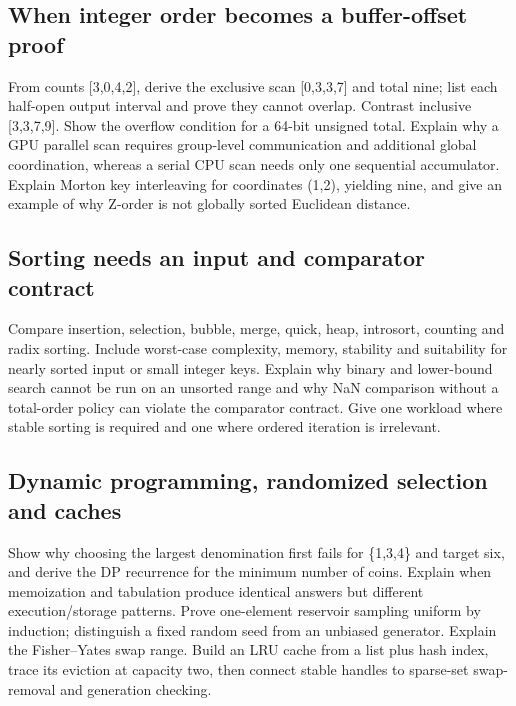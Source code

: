 \subsection{When integer order becomes a buffer-offset proof}\label{appendix-8a046b38375e-when-integer-order-becomes-a-buffer-offset-proof}

\hypertarget{appendix-8a046b38375e-when-integer-order-becomes-a-buffer-offset-proof}{}

From counts {[}3,0,4,2{]}, derive the exclusive scan {[}0,3,3,7{]} and total nine; list each half-open output interval and prove they cannot overlap. Contrast inclusive {[}3,3,7,9{]}. Show the overflow condition for a 64-bit unsigned total. Explain why a GPU parallel scan requires group-level communication and additional global coordination, whereas a serial CPU scan needs only one sequential accumulator. Explain Morton key interleaving for coordinates (1,2), yielding nine, and give an example of why Z-order is not globally sorted Euclidean distance.

\subsection{Sorting needs an input and comparator contract}\label{appendix-8a046b38375e-sorting-needs-an-input-and-comparator-contract}

\hypertarget{appendix-8a046b38375e-sorting-needs-an-input-and-comparator-contract}{}

Compare insertion, selection, bubble, merge, quick, heap, introsort, counting and radix sorting. Include worst-case complexity, memory, stability and suitability for nearly sorted input or small integer keys. Explain why binary and lower-bound search cannot be run on an unsorted range and why NaN comparison without a total-order policy can violate the comparator contract. Give one workload where stable sorting is required and one where ordered iteration is irrelevant.

\subsection{Dynamic programming, randomized selection and caches}\label{appendix-8a046b38375e-dynamic-programming-randomized-selection-and-caches}

\hypertarget{appendix-8a046b38375e-dynamic-programming-randomized-selection-and-caches}{}

Show why choosing the largest denomination first fails for \{1,3,4\} and target six, and derive the DP recurrence for the minimum number of coins. Explain when memoization and tabulation produce identical answers but different execution/storage patterns. Prove one-element reservoir sampling uniform by induction; distinguish a fixed random seed from an unbiased generator. Explain the Fisher--Yates swap range. Build an LRU cache from a list plus hash index, trace its eviction at capacity two, then connect stable handles to sparse-set swap-removal and generation checking.

